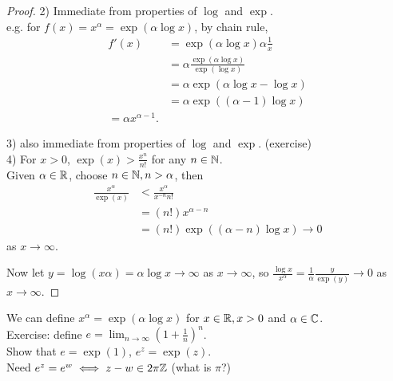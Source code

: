 \documentclass[a4paper]{article}
\begin{document}
\begin{thm}
\begin{proof}
2) Immediate from properties of $\log$ and $\exp$.\\
e.g. for $f\left(x\right)=x^\alpha = \exp\left(\alpha \log x\right)$, by chain rule, \\
\begin{equation*}
\begin{aligned}
f'\left(x\right)&=\exp\left(\alpha \log x\right)\alpha \frac{1}{x}\\
&=\alpha \frac{\exp\left(\alpha \log x\right)}{\exp\left(\log x\right)}\\
&= \alpha \exp\left(\alpha \log x-\log x\right)\\
&=\alpha \exp\left(\left(\alpha-1\right)\log x\right)\\
=\alpha x^{\alpha-1}.
\end{aligned}
\end{equation*}

3) also immediate from properties of $\log$ and $\exp$. (exercise)\\

4) For $x>0$, $\exp\left(x\right)>\frac{x^n}{n!}$ for any $n\in\mathbb{N}$.\\
Given $\alpha\in\mathbb{R}$, choose $n\in\mathbb{N}, n>\alpha$, then\\
\begin{equation*}
\begin{aligned}
\frac{x^\alpha}{\exp\left(x\right)}&<\frac{x^\alpha}{x^{-n} n!}\\
&=\left(n!\right) x^{\alpha - n}\\
&=\left(n!\right)\exp\left(\left(\alpha - n\right)\log x\right) \to 0
\end{aligned}
\end{equation*}
as $x\to\infty$.

Now let $y=\log\left(x\alpha\right) = \alpha \log x \to \infty$ as $x \to \infty$, so $\frac{\log x}{x^\alpha}=\frac{1}{\alpha}\frac{y}{\exp\left(y\right)}\to 0$ as $x\to\infty$.
\end{proof}
\end{thm}

We can define $x^\alpha = \exp\left(\alpha\log x\right)$ for $x\in\mathbb{R}, x>0$ and $\alpha\in\mathbb{C}$.\\
Exercise: define $e=\lim_{n\to\infty} \left(1+\frac{1}{n}\right)^n$.\\
Show that $e=\exp\left(1\right)$, $e^z=\exp\left(z\right)$.\\
Need $e^z=e^w \iff z-w\in 2\pi\mathbb{Z}$ (what is $\pi$?)
\end{document}
